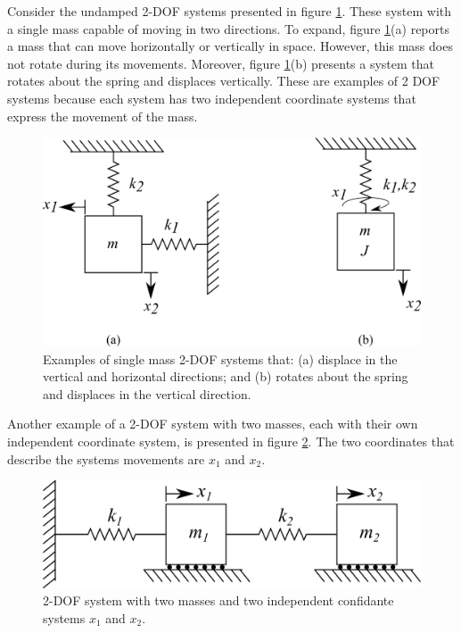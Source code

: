 \documentclass[12pt,letter]{article}
\numberwithin{ex}{section} %
\numberwithin{re}{section} %
\begin{document}
Consider the undamped 2-DOF systems presented in figure \ref{fig:2-DOF-spring_mass_examples}. These system with a single mass capable of moving in two directions. To expand, figure \ref{fig:2-DOF-spring_mass_examples}(a) reports a mass that can move horizontally or vertically in space. However, this mass does not rotate during its movements. Moreover, figure \ref{fig:2-DOF-spring_mass_examples}(b) presents a system that rotates about the spring and displaces vertically. These are examples of 2 DOF systems because each system has two independent coordinate systems that express the movement of the mass. 
\begin{figure}[H]
	\centering
	\includegraphics[]{../Figures/2-DOF-spring_mass_examples.png}
	\caption{Examples of single mass 2-DOF systems that: (a) displace in the vertical and horizontal directions; and (b) rotates about the spring and displaces in the vertical direction. }
	\label{fig:2-DOF-spring_mass_examples}
\end{figure}
Another example of a 2-DOF system with two masses, each with their own independent coordinate system, is presented in figure \ref{fig:2-DOF-spring_mass_horizontal}. The two coordinates that describe the systems movements are $x_1$ and $x_2$.
\begin{figure}[H]
	\centering
	\includegraphics[]{../Figures/2-DOF-spring_mass_horizontal.png}
	\caption{2-DOF system with two masses and two independent confidante systems $x_1$ and $x_2$.}
	\label{fig:2-DOF-spring_mass_horizontal}
\end{figure}
\end{document}
